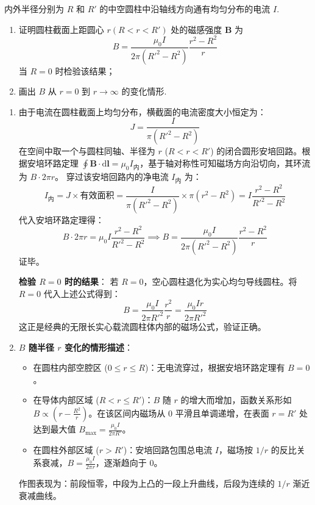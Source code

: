 \begin{exercise}\label{ex:17.7}
内外半径分别为 $R$ 和 $R'$ 的中空圆柱中沿轴线方向通有均匀分布的电流 $I$. 
\begin{enumerate}
  \item[(a)] 证明圆柱截面上距圆心 $r(R < r < R')$ 处的磁感强度 $\boldsymbol{B}$ 为
  $$ B = \frac{\mu_0 I}{2\pi(R'^2 - R^2)} \frac{r^2 - R^2}{r} $$
  当 $R=0$ 时检验该结果；
  \item[(b)] 画出 $B$ 从 $r=0$ 到 $r \to \infty$ 的变化情形.
\end{enumerate}
\end{exercise}
\begin{solution}
\begin{enumerate}
    \item[(a)] 由于电流在圆柱截面上均匀分布，横截面的电流密度大小恒定为：
    $$ J = \frac{I}{\pi (R'^2 - R^2)} $$
    在空间中取一个与圆柱同轴、半径为 $r$ ($R < r < R'$) 的闭合圆形安培回路。根据安培环路定理 $\oint \boldsymbol{B} \cdot \mathrm{d}\boldsymbol{l} = \mu_0 I_{\text{内}}$，基于轴对称性可知磁场方向沿切向，其环流为 $B \cdot 2\pi r$。
    穿过该安培回路内的净电流 $I_{\text{内}}$ 为：
    $$ I_{\text{内}} = J \times \text{有效面积} = \frac{I}{\pi (R'^2 - R^2)} \times \pi (r^2 - R^2) = I \frac{r^2 - R^2}{R'^2 - R^2} $$
    代入安培环路定理得：
    $$ B \cdot 2\pi r = \mu_0 I \frac{r^2 - R^2}{R'^2 - R^2} \implies B = \frac{\mu_0 I}{2\pi(R'^2 - R^2)} \frac{r^2 - R^2}{r} $$
    证毕。

    \textbf{检验 $R=0$ 时的结果}：
    若 $R=0$，空心圆柱退化为实心均匀导线圆柱。将 $R=0$ 代入上述公式得到：
    $$ B = \frac{\mu_0 I}{2\pi R'^2} \frac{r^2}{r} = \frac{\mu_0 I r}{2\pi R'^2} $$
    这正是经典的无限长实心载流圆柱体内部的磁场公式，验证正确。

    \item[(b)] \textbf{$B$ 随半径 $r$ 变化的情形描述}：
    \begin{itemize}
        \item 在圆柱内部空腔区 ($0 \le r \le R$)：无电流穿过，根据安培环路定理有 $B = 0$。
        \item 在导体内部区域 ($R < r \le R'$)：$B$ 随 $r$ 的增大而增加，函数关系形如 $B \propto \left(r - \frac{R^2}{r}\right)$。在该区间内磁场从 $0$ 平滑且单调递增，在表面 $r=R'$ 处达到最大值 $B_{\max} = \frac{\mu_0 I}{2\pi R'}$。
        \item 在圆柱外部区域 ($r > R'$)：安培回路包围总电流 $I$，磁场按 $1/r$ 的反比关系衰减，$B = \frac{\mu_0 I}{2\pi r}$，逐渐趋向于 $0$。
    \end{itemize}
    作图表现为：前段恒零，中段为上凸的一段上升曲线，后段为连续的 $1/r$ 渐近衰减曲线。
\end{enumerate}
\end{solution}

